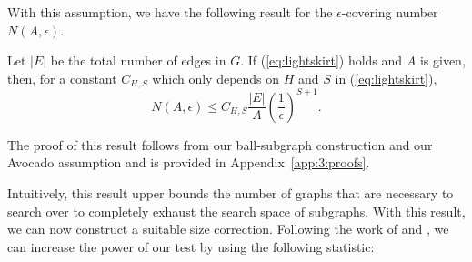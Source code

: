 With this assumption, we have the following result for the $\epsilon$-covering number $N(A,\epsilon)$.
\begin{lemma}
	\label{lm:entropy}
        Let $|E|$ be the total number of edges in $G$. If (\ref{eq:lightskirt}) holds and $A$ is given, 
        then, for a constant $C_{H,S}$ which only depends on $H$ and $S$ in (\ref{eq:lightskirt}),
	{\begin{equation}
	    \label{eq:entropy}
	    N(A,\epsilon)\le C_{H,S}\frac{|E|}{ A}\left(\frac{1}{ \epsilon}\right)^{S+1}.
	\end{equation}}
\end{lemma}
The proof of this result follows from our ball-subgraph construction and our Avocado assumption and is provided in Appendix~\ref{app:3:proofs}.

Intuitively, this result upper bounds the number of graphs that are necessary to search over to completely exhaust the search space of subgraphs. With this result, we can now construct a suitable size correction. 
Following the work of \cite{walther2010optimal} and \cite{wang2016structured}, we can increase the power of our test by using the following statistic:
